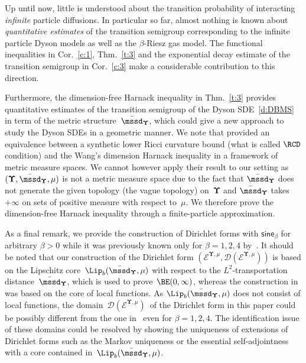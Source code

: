 \documentclass[11pt,letterpaper]{amsart}
\newcommand{\dom}[1]{\mathcal D(#1)}
\newcommand{\purple}[1]{{\color{purple}#1}}
\newcommand{\QP}{{\mu}}
\newcommand{\dUpsilon}{{\mathbf \Upsilon}}
\newcommand{\U}{\dUpsilon}
\newcommand{\sine}{\mathsf{sine}}
\newcommand{\E}{\mathcal E}
\renewcommand{\1}{\mathbf 1}
\numberwithin{equation}{section}
\theoremstyle{plain}
\theoremstyle{definition}
\theoremstyle{remark}
\begin{document}
Up until now, little is understood about the transition probability of interacting {\it infinite} particle diffusions.  In particular so far, almost nothing is known about {\it quantitative estimates} of the transition semigroup corresponding to the infinite particle Dyson models as well as the $\beta$-Riesz gas model. The functional inequalities in  Cor.~\ref{c:1}, Thm.~\ref{t:3}  and the exponential decay estimate of the transition semigroup in Cor.~\ref{c:3} make a considerable contribution to this direction. 

Furthermore, the dimension-free Harnack inequality in Thm.~\ref{t:3} provides quantitative estimates of the transition semigroup of the Dyson SDE~\eqref{d:DBMS} in term of the metric structure~$\bar\mssd_\U$, which could give a new approach to study the Dyson SDEs in a geometric manner.  We note that \cite{KopStu21} provided an equivalence between a synthetic lower Ricci curvature bound (what is called $\RCD$ condition) and the Wang's dimension Harnack inequality in a framework of metric measure spaces. We cannot however apply their result to our setting as $(\U, \bar\mssd_\U, \QP)$ is not a metric measure space due to the fact that $\bar\mssd_\U$ does not generate the given topology (the vague topology) on~$\U$ and $\bar\mssd_\U$ takes $+\infty$ on sets of positive measure with respect to~$\QP$. We therefore prove the dimension-free Harnack inequality through a finite-particle approximation.

As a final remark, we provide the construction of Dirichlet forms with $\sine_\beta$ for arbitrary $\beta>0$ while it was previously known only for $\beta=1, 2, 4$ by~\cite{Osa96, Osa13}. It should be noted that our construction of the Dirichlet form $(\E^{\U, \QP}, \dom{\E^{\U, \QP}})$ is based on the Lipschitz core~$\Lip_b(\bar\mssd_\U, \QP)$ with respect to the $L^2$-transportation distance~$\bar\mssd_\U$, which is used to prove~$\BE(0,\infty)$, whereas the construction in~\cite{Osa96, Osa13} was based on the core of local functions. As $\Lip_b(\bar\mssd_\U, \QP)$ does not consist of local functions, the domain~$\dom{\E^{\U, \QP}}$~of the Dirichlet form in this paper could be possibly different from the one in~\cite{Osa96, Osa13} even for $\beta=1,2,4$. The identification issue of these domains could be resolved by showing the uniqueness of extensions of Dirichlet forms such as the Markov uniqueness or the essential self-adjointness with a core contained in~$\Lip_b(\bar\mssd_\U, \QP)$. 
\end{document}
